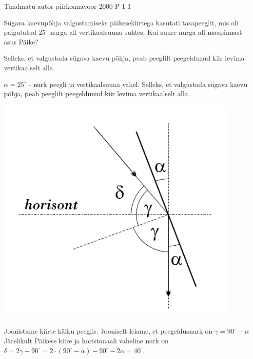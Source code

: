 {Tundmatu autor} %
{piirkonnavoor} %
{2000} %
{P 1} %
{1} %
{
\ifStatement
Sügava kaevupõhja valgustamiseks päikesekiirtega kasutati tasapeeglit, mis oli paigutatud $25^{\circ}$ nurga all vertikaalsuuna suhtes. Kui suure nurga all maapinnast asus Päike?
\fi

\ifHint
Selleks, et valgustada sügava kaevu põhja, peab peeglilt peegeldunud kiir levima vertikaalselt alla.
\fi


\ifSolution
$\alpha = 25^{\circ}$ - nurk peegli ja vertikaalsuuna vahel. Selleks, et valgustada sügava kaevu põhja, peab peeglilt peegeldunud kiir levima vertikaalselt alla.
\begin{center}
	\includegraphics[width=0.5\linewidth]{2000-v2p-01-lah.PNG}
\end{center}
Joonistame kiirte käiku peeglis. Jooniselt leiame, et peegeldusnurk on $\gamma = 90 ^{\circ} - \alpha$
Järelikult Päikese kiire ja horistonaali vaheline nurk on $\delta = 2 \gamma - 90 ^{\circ} = 2 \cdot (90 ^{\circ} - \alpha) - 90 ^{\circ} - 2 \alpha = 40 ^{\circ}$.
\fi
}